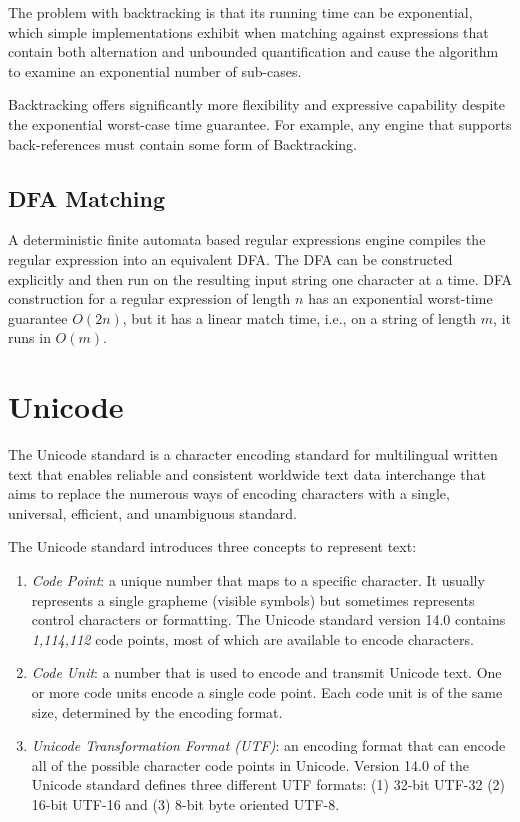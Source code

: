 The problem with backtracking is that its running time can be exponential, which simple implementations exhibit when matching against expressions that contain both alternation and unbounded quantification and cause the algorithm to examine an exponential number of sub-cases.

Backtracking offers significantly more flexibility and expressive capability despite the exponential worst-case time guarantee. For example, any engine that supports back-references must contain some form of Backtracking.

\subsection{DFA Matching}

A deterministic finite automata based regular expressions engine compiles the regular expression into an equivalent DFA. The DFA can be constructed explicitly and then run on the resulting input string one character at a time. DFA construction for a regular expression of length $n$ has an exponential worst-time guarantee $O(2{n})$, but it has a linear match time, i.e., on a string of length $m$, it runs in $O(m)$.

\section{Unicode}
The Unicode standard \cite{unicode} is a character encoding standard for multilingual written text that enables reliable and consistent worldwide text data interchange that aims to replace the numerous ways of encoding characters with a single, universal, efficient, and unambiguous standard.

The Unicode standard introduces three concepts to represent text:
\begin{enumerate}
    \item \textit{Code Point}: a unique number that maps to a specific character. It usually represents a single grapheme (visible symbols) but sometimes represents control characters or formatting. The Unicode standard version 14.0 contains \textit{1,114,112} code points, most of which are available to encode characters.
    
    \item \textit{Code Unit}: a number that is used to encode and transmit Unicode text. One or more code units encode a single code point. Each code unit is of the same size, determined by the encoding format.
    
    \item \textit{Unicode Transformation Format (UTF)}: an encoding format that can encode all of the possible character code points in Unicode. Version 14.0 of the Unicode standard defines three different UTF formats: (1) 32-bit UTF-32 (2) 16-bit UTF-16 and (3) 8-bit byte oriented UTF-8.
\end{enumerate}

